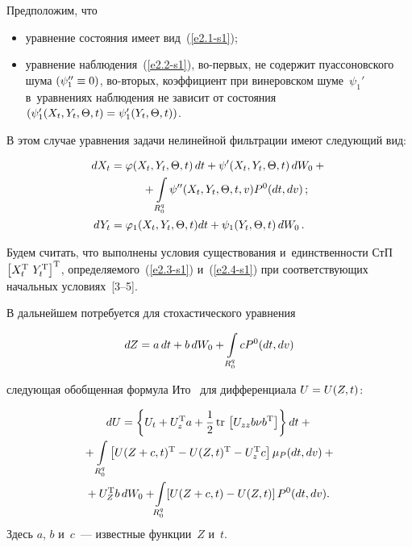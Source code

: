 \begin{multicols}{2}
Предположим, что
\begin{itemize}
\item уравнение состояния имеет вид~(\ref{e2.1-s1});
\item уравнение наблюдения~(\ref{e2.2-s1}), во-пер\-вых, не содержит
пуассоновского шума $(\psi_1'' \hm\equiv 0)$,
во-вто\-рых, коэффициент при винеровском шуме~$\psi_1'$  
в~уравнениях наблюдения не зависит от состояния $(\psi_1' (X_t, Y_t,\Theta, t)\hm=\psi_1'
(Y_t,\Theta, t))$.
\end{itemize}

В этом случае уравнения задачи нелинейной фильтрации имеют следующий вид:

\noindent
\begin{align}
    dX_t &=\varphi (X_t, Y_t,\Theta, t)\,dt+\psi'(X_t, Y_t,\Theta, t)\,dW_0+{}\notag\\
&\hspace*{10mm}{}+\int\limits_{R_0^q} \psi''(X_t, Y_t,\Theta, t,v) P^0 (dt, dv)\,;
        \label{e2.3-s1}\\
    dY_t &=\varphi_1 (X_t, Y_t,\Theta, t)dt +\psi_1 (Y_t,\Theta, t)\, dW_0\,.
    \label{e2.4-s1}
    \end{align}


Будем считать, что выполнены условия существования и~единственности 
СтП  $\lk X_t^{\mathrm{T}}\ Y_t^{\mathrm{T}}\rk^{\mathrm{T}}$, 
определяемого~(\ref{e2.3-s1}) и~(\ref{e2.4-s1}) при соответствующих начальных 
условиях~[3--5].

В дальнейшем потребуется для стохастического уравнения

    \vspace*{2pt}

\noindent
    \begin{equation}
    dZ=a \,dt + b\, dW_0 + \int\limits_{R_0^q} c P^0 (dt, dv)
    \label{e2.5-s1}
    \end{equation}
    
    \vspace*{-2pt}
    
    \noindent
следующая обобщенная формула Ито~\cite{4-s1, 7-s1} для дифференциала  $U\hm=U(Z,t)$:

\columnbreak

\noindent
\begin{multline}
    dU =\lf U_t + U_z^{\mathrm{T}} a + \fr{1}{2}\,\mathrm{tr}\, 
    \lk U_{zz} b\nu b^{\mathrm{T}}\rk\rf dt +{}\\
{}+ \iii_{R_0^q} \lk U(Z+c,t)^{\mathrm{T}} - U(Z,t)^{\mathrm{T}} - U_z^{\mathrm{T}} c\rk 
\mu_P (dt, dv)+{}\\
\hspace*{-3mm}{}+U_Z^{\mathrm{T}} b\, dW_0 + \!\iii_{R_0^q}\! \lk U(Z+c,t) - U(Z,t) \rk P^0 (dt, dv).\!\!\!
  \label{e2.6-s1}
\end{multline}
Здесь $a$, $b$ и~$c$~--- известные функции~$Z$ и~$t$.


\end{multicols}
